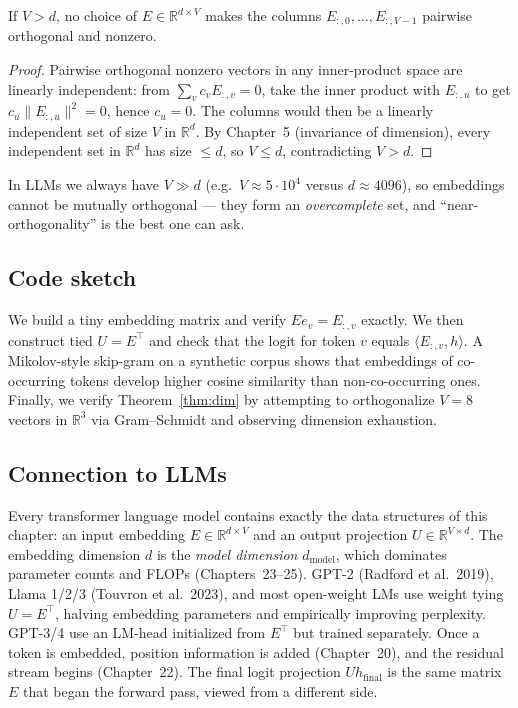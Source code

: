 \begin{theorem}\label{thm:dim}
If $V>d$, no choice of $E\in\mathbb{R}^{d\times V}$ makes the columns $E_{:,0},\dots,E_{:,V-1}$ pairwise orthogonal and nonzero.
\end{theorem}

\begin{proof}
Pairwise orthogonal nonzero vectors in any inner-product space are linearly independent: from $\sum_v c_v E_{:,v}=0$, take the inner product with $E_{:,u}$ to get $c_u\|E_{:,u}\|^2=0$, hence $c_u=0$. The columns would then be a linearly independent set of size $V$ in $\mathbb{R}^d$. By Chapter~5 (invariance of dimension), every independent set in $\mathbb{R}^d$ has size $\le d$, so $V\le d$, contradicting $V>d$.
\end{proof}

In LLMs we always have $V\gg d$ (e.g.\ $V\approx 5\cdot 10^4$ versus $d\approx 4096$), so embeddings cannot be mutually orthogonal --- they form an \emph{overcomplete} set, and ``near-orthogonality'' is the best one can ask.

\subsection*{Code sketch}

We build a tiny embedding matrix and verify $E e_v=E_{:,v}$ exactly. We then construct tied $U=E^\top$ and check that the logit for token $v$ equals $\langle E_{:,v},h\rangle$. A Mikolov-style skip-gram on a synthetic corpus shows that embeddings of co-occurring tokens develop higher cosine similarity than non-co-occurring ones. Finally, we verify Theorem~\ref{thm:dim} by attempting to orthogonalize $V=8$ vectors in $\mathbb{R}^3$ via Gram--Schmidt and observing dimension exhaustion.

\subsection*{Connection to LLMs}

Every transformer language model contains exactly the data structures of this chapter: an input embedding $E\in\mathbb{R}^{d\times V}$ and an output projection $U\in\mathbb{R}^{V\times d}$. The embedding dimension $d$ is the \emph{model dimension} $d_{\mathrm{model}}$, which dominates parameter counts and FLOPs (Chapters~23--25). GPT-2 (Radford et al.\ 2019), Llama 1/2/3 (Touvron et al.\ 2023), and most open-weight LMs use weight tying $U=E^\top$, halving embedding parameters and empirically improving perplexity. GPT-3/4 use an LM-head initialized from $E^\top$ but trained separately. Once a token is embedded, position information is added (Chapter~20), and the residual stream begins (Chapter~22). The final logit projection $Uh_{\text{final}}$ is the same matrix $E$ that began the forward pass, viewed from a different side.
